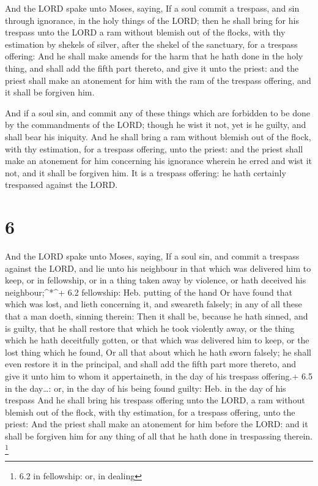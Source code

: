  And the LORD spake unto Moses, saying,  If a
soul commit a trespass, and sin through ignorance, in the holy things of
the LORD; then he shall bring for his trespass unto the LORD a ram
without blemish out of the flocks, with thy estimation by shekels of
silver, after the shekel of the sanctuary, for a trespass offering:
 And he shall make amends for the harm that he hath done in
the holy thing, and shall add the fifth part thereto, and give it unto
the priest: and the priest shall make an atonement for him with the ram
of the trespass offering, and it shall be forgiven him.

 And if a soul sin, and commit any of these things which
are forbidden to be done by the commandments of the LORD; though he wist
it not, yet is he guilty, and shall bear his iniquity.  And
he shall bring a ram without blemish out of the flock, with thy
estimation, for a trespass offering, unto the priest: and the priest
shall make an atonement for him concerning his ignorance wherein he
erred and wist it not, and it shall be forgiven him.  It is
a trespass offering: he hath certainly trespassed against the LORD.

\hypertarget{section-5}{%
\section{6}\label{section-5}}

 And the LORD spake unto Moses, saying,  If a
soul sin, and commit a trespass against the LORD, and lie unto his
neighbour in that which was delivered him to keep, or in fellowship, or
in a thing taken away by violence, or hath deceived his
neighbour;\^{}*\^{}+ 6.2 fellowship: Heb. putting of the hand
 Or have found that which was lost, and lieth concerning it,
and sweareth falsely; in any of all these that a man doeth, sinning
therein:  Then it shall be, because he hath sinned, and is
guilty, that he shall restore that which he took violently away, or the
thing which he hath deceitfully gotten, or that which was delivered him
to keep, or the lost thing which he found,  Or all that
about which he hath sworn falsely; he shall even restore it in the
principal, and shall add the fifth part more thereto, and give it unto
him to whom it appertaineth, in the day of his trespass offering.+ 6.5
in the day\ldots: or, in the day of his being found guilty: Heb. in the
day of his trespass  And he shall bring his trespass
offering unto the LORD, a ram without blemish out of the flock, with thy
estimation, for a trespass offering, unto the priest:  And
the priest shall make an atonement for him before the LORD: and it shall
be forgiven him for any thing of all that he hath done in trespassing
therein. \footnote{6.2 in fellowship: or, in dealing}

